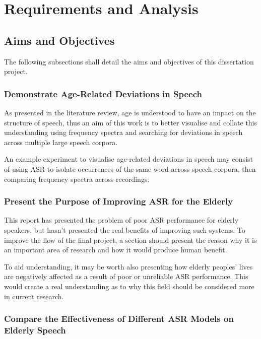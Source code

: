\chapter{Requirements and Analysis}\label{ch:requirements-and-analysis}

\section{Aims and Objectives}\label{sec:aims-and-objectives2}

The following subsections shall detail the aims and objectives of this dissertation project.

\subsection{Demonstrate Age-Related Deviations in Speech}\label{subsec:aim1}

As presented in the literature review, age is understood to have an impact on the structure of
speech, thus an aim of this work is to better visualise and collate this understanding using
frequency spectra and searching for deviations in speech across multiple large speech corpora.

An example experiment to visualise age-related deviations in speech may consist of using ASR to
isolate occurrences of the same word across speech corpora, then comparing frequency spectra
across recordings.

\subsection{Present the Purpose of Improving ASR for the Elderly}\label{subsec:aim1andahalf}

This report has presented the problem of poor ASR performance for elderly speakers, but hasn't
presented the real benefits of improving such systems.
To improve the flow of the final project, a section should present the reason why it is an
important area of research and how it would produce human benefit.

To aid understanding, it may be worth also presenting how elderly peoples' lives are negatively
affected as a result of poor or unreliable ASR performance.
This would create a real understanding as to why this field should be considered more in current
research.

\subsection{Compare the Effectiveness of Different ASR Models on Elderly Speech}\label{subsec:aim2}

